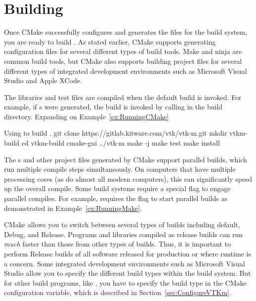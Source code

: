 

\section{Building \VTKm}

Once CMake successfully configures \VTKm and generates the files for the build system, you are ready to build \VTKm.
As stated earlier, CMake supports generating configuration files for several different types of build tools.
Make and ninja are common build tools, but CMake also supports building project files for several different types of integrated development environments such as Microsoft Visual Studio and Apple XCode.

The \VTKm libraries and test files are compiled when the default build is invoked.
For example, if s were generated, the build is invoked by calling  in the build directory.
Expanding on Example~\ref{ex:RunningCMake}

\begin{blankexample}[ex:RunningMake]{Using  to build \VTKm.}
git clone https://gitlab.kitware.com/vtk/vtk-m.git
mkdir vtkm-build
cd vtkm-build
cmake-gui ../vtk-m
make -j
make test
make install
\end{blankexample}

\begin{didyouknow}
  The s and other project files generated by CMake support parallel builds, which run multiple compile steps simultaneously.
  On computers that have multiple processing cores (as do almost all modern computers), this can significantly speed up the overall compile.
  Some build systems require a special flag to engage parallel compiles.
  For example,  requires the  flag to start parallel builds as demonstrated in Example~\ref{ex:RunningMake}.
\end{didyouknow}

\begin{commonerrors}
  CMake allows you to switch between several types of builds including default, Debug, and Release.
  Programs and libraries compiled as release builds can run \emph{much} faster than those from other types of builds.
  Thus, it is important to perform Release builds of all software released for production or where runtime is a concern.
  Some integrated development environments such as Microsoft Visual Studio allow you to specify the different build types within the build system.
  But for other build programs, like , you have to specify the build type in the  CMake configuration variable, which is described in Section~\ref{sec:ConfigureVTKm}.
\end{commonerrors}

